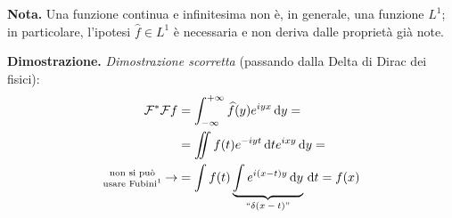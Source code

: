 
\textbf{Nota.} Una funzione continua e infinitesima non è, in generale, una funzione $L^1$; in particolare, l'ipotesi $\hat{f} \in L^1$ è necessaria e non deriva dalle proprietà già note.

\textbf{Dimostrazione.}
\textit{Dimostrazione scorretta} (passando dalla Delta di Dirac dei fisici):
$$
\begin{aligned}
	\mathcal F^* \mathcal F f 
	& = \int_{-\infty}^{+\infty} \hat f(y) e^{iyx} \dd y = \\
	& = \iint f(t) e^{-iyt} \dd t e^{ixy} \dd y = \\
	\substack{\text{non si può} \\ \text{usare Fubini\footnotemark}}\to & = \int f(t) \underbrace{\int e^{i(x-t)y} \dd y}_{\text{``$\delta(x-t)$''}} \dd t = f(x)
\end{aligned}
$$

